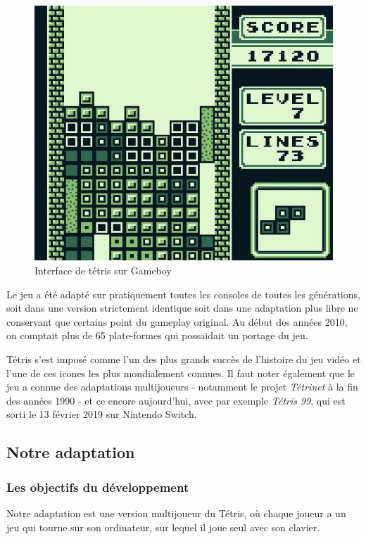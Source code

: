\documentclass[a4paper, 12pt]{article}
\begin{document}
		\begin{figure}[tb]
			\centering
			\includegraphics[scale=0.45]{img/Tetris8.jpg}
			\caption{Interface de tétris sur Gameboy}
			\label{fig:rezo}
		\end{figure}

		

		Le jeu a été adapté sur pratiquement toutes les consoles de toutes les générations, soit dans une version strictement identique soit dans une adaptation plus libre ne conservant que certains point du gameplay original. Au début des années 2010, on comptait plus de 65 plate-formes qui possaidait un portage du jeu.

		Tétris s'est imposé comme l'un des plus grands succès de l'histoire du jeu vidéo et l'une de ces icones les plus mondialement connues. Il faut noter également que le jeu a connue des adaptations multijoueurs - notamment le projet \emph{Tétrinet} à la fin des années 1990 - et ce encore aujourd'hui, avec par exemple \emph{Tétris 99}, qui est sorti le 13 février 2019 sur Nintendo Switch.

	\subsection{Notre adaptation}
		\subsubsection{Les objectifs du développement}
			Notre adaptation est une version multijoueur du Tétris, où chaque joueur a un jeu qui tourne sur son ordinateur, sur lequel il joue seul avec son clavier. 
\end{document}

